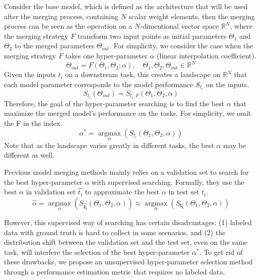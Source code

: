 
Consider the base model, which is defined as the architecture that will be used after the merging process, containing $N$ scalar weight elements, then the merging process can be seen as the operation on a $N$-dimentional vector space $\mathbb{R}^N$, where the merging strategy $F$ transform two input points as initial parameters $\Theta_1$ and $\Theta_2$ to the merged parameters $\Theta_{out}$. For simplicity, we consider the case when the merging strategy $F$ takes one hyper-parameter $\alpha$ (linear interpolation coefficient).
\[
\Theta_{out} = F(\Theta_1, \Theta_2; \alpha), \quad \Theta_1, \Theta_2, \Theta_{out} \in \mathbb{R}^N
\]
Given the inputs $t_i$ on a downstream task, this creates a landscape on $\mathbb{R}^N$ that each model parameter corresponds to the model performance $S_{t_i}$ on the inputs.
\[
S_{t_i}(\Theta_{out}) = S_{t_i, F}(\Theta_1, \Theta_2, \alpha)
\]
Therefore, the goal of the hyper-parameter searching is to find the best $\alpha$ that maximize the merged model's performance on the tasks. For simplicity, we omit the F in the index.
\[
\alpha^* = \operatorname*{argmax}_{\alpha}(S_{t_i}(\Theta_1, \Theta_2, \alpha))
\]
Note that as the landscape varies greatly in different tasks, the best $\alpha$ may be different as well.


Previous model merging methods mainly relies on a validation set to search for the best hyper-parameter $\alpha$ with supervised searching. Formally, they use the best $\alpha$ in validation set $\hat{t_i}$ to approximate the best $\alpha$ in test set $t_i$.
\[
\hat{\alpha} = \operatorname*{argmax}_{\alpha}(S_{\mathbf{\hat{t_i}}}(\Theta_1, \Theta_2, \alpha)) \approx \operatorname*{argmax}_{\alpha}(S_{\mathbf{t_i}}(\Theta_1, \Theta_2, \alpha))
\]

However, this supervised way of searching has certain disadvantages: (1) labeled data with ground truth is hard to collect in some scenarios, and (2) the distribution shift between the validation set and the test set, even on the same task, will interfere the selection of the best hyper-parameter $\alpha^*$. To get rid of these drawbacks, we propose an unsupervised hyper-parameter selection method through a performance estimation metric that requires no labeled data.

